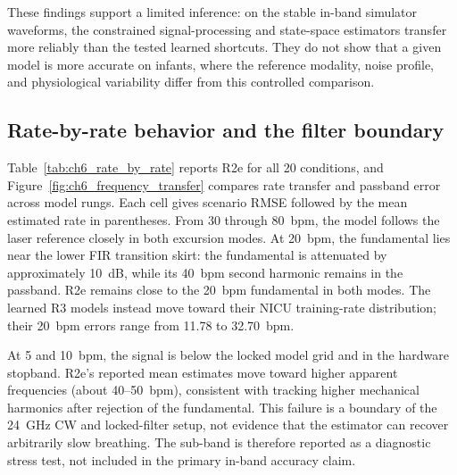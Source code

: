 These findings support a limited inference: on the stable in-band simulator waveforms, the constrained signal-processing and state-space estimators transfer more reliably than the tested learned shortcuts. They do not show that a given model is more accurate on infants, where the reference modality, noise profile, and physiological variability differ from this controlled comparison.

\subsection{Rate-by-rate behavior and the filter boundary}

Table~\ref{tab:ch6_rate_by_rate} reports R2e for all 20 conditions, and Figure~\ref{fig:ch6_frequency_transfer} compares rate transfer and passband error across model rungs. Each cell gives scenario RMSE followed by the mean estimated rate in parentheses. From 30 through 80~bpm, the model follows the laser reference closely in both excursion modes. At 20~bpm, the fundamental lies near the lower FIR transition skirt: the fundamental is attenuated by approximately 10~dB, while its 40~bpm second harmonic remains in the passband. R2e remains close to the 20~bpm fundamental in both modes. The learned R3 models instead move toward their NICU training-rate distribution; their 20~bpm errors range from 11.78 to 32.70~bpm.

At 5 and 10~bpm, the signal is below the locked model grid and in the hardware stopband. R2e's reported mean estimates move toward higher apparent frequencies (about 40--50~bpm), consistent with tracking higher mechanical harmonics after rejection of the fundamental. This failure is a boundary of the 24~GHz CW and locked-filter setup, not evidence that the estimator can recover arbitrarily slow breathing. The sub-band is therefore reported as a diagnostic stress test, not included in the primary in-band accuracy claim.

